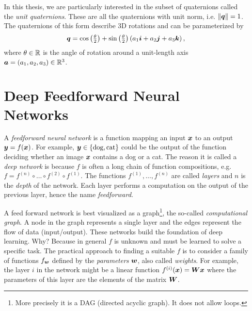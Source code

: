 		In this thesis, we are particularly interested in the subset of quaternions called the \emph{unit quaternions}. These are all the quaternions with unit norm, i.e. $\lVert \bm{q} \rVert = 1$. 
		The quaternions of this form describe 3D rotations and can be parameterized by
		\begin{equation}
			\bm{q} = 
			\cos\left(\tfrac{\theta}{2}\right) + 
			\sin\left(\tfrac{\theta}{2}\right) \left(a_1 \bm{i} + a_2 \bm{j} + a_3 \bm{k}\right),
		\end{equation}
		where $\theta \in \mathbb{R}$ is the angle of rotation around a unit-length axis $\bm{a} = (a_1, a_2, a_3) \in \mathbb{R}^3$.
	
	\section{Deep Feedforward Neural Networks}
		A \emph{feedforward neural network} is a function mapping an input $\bm{x}$ to an output $\bm{y} = f(\bm{x})$.
		For example, $\bm{y} \in \{\text{dog}, \text{cat} \}$ could be the output of the function deciding whether an image $\bm{x}$ contains a dog or a cat. 
		The reason it is called a \emph{deep network} is because $f$ is often a long chain of function compositions, e.g. 
		$f = f^{(n)} \circ  \ldots  \circ f^{(2)} \circ f^{(1)}$.
		The functions $f^{(1)}, \dots, f^{(n)}$ are called \emph{layers} and $n$ is the \emph{depth} of the network.
		Each layer performs a computation on the output of the previous layer, hence the name \emph{feedforward}.
		
		A feed forward network is best visualized as a graph\footnote{More precisely it is a DAG (directed acyclic graph). It does not allow loops.}, the so-called \emph{computational graph}.
		A node in the graph represents a single layer and the edges represent the flow of data (input/output).
		These networks build the foundation of deep learning.
		Why?
		Because in general $f$ is unknown and must be learned to solve a specific task.
		The practical approach to finding a suitable $f$ is to consider a family of functions $f_{\bm{w}}$ defined by the \emph{parameters} $\bm{w}$, also called \emph{weights}.
		For example, the layer $i$ in the network might be a linear function $f_{}^{(i)}(\bm{x}) = \bm{W} \bm{x}$ where the parameters of this layer are the elements of the matrix $\bm{W}$.
		

